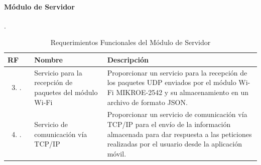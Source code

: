 \paragraph{Módulo de Servidor}.
\begin{longtable}{|M{1.6cm}|M{4.0cm}|M{6.0cm}|}
    \caption{Requerimientos Funcionales del Módulo de Servidor}
	\hline
	\textbf{RF} & \textbf{Nombre} & \textbf{Descripción} \\ 
	\hline
 	\begin{enumerate}[label=RF\arabic*]
 	    \setcounter{enumi}{2}
 	    \item.
 	\end{enumerate}
 	& Servicio para la recepción de paquetes del módulo Wi-Fi
 	& Proporcionar un servicio para la recepción de los paquetes UDP enviados por el módulo Wi-Fi MIKROE-2542 y su almacenamiento en un archivo de formato JSON.\\
    \hline
    \begin{enumerate}[label=RF\arabic*]
        \setcounter{enumi}{3}
 	    \item.
 	\end{enumerate}
 	& Servicio de comunicación vía TCP/IP
 	& Proporcionar un servicio de comunicación vía TCP/IP para el envío de la información almacenada para dar respuesta a las peticiones realizadas por el usuario desde la aplicación móvil. \\
    \hline
\end{longtable}



